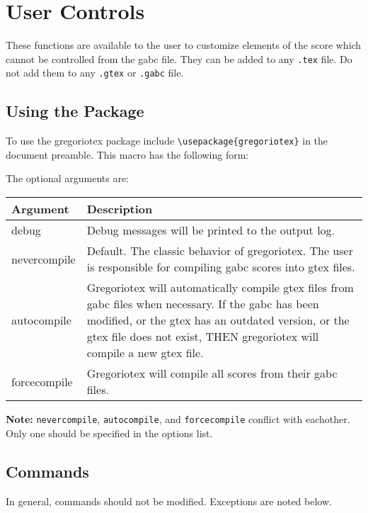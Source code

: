 \section{User Controls}

These functions are available to the user to customize elements of the
score which cannot be controlled from the gabc file. They can be added
to any \verb=.tex= file. Do not add them to any \verb=.gtex= or
\verb=.gabc= file.

\subsection{Using the Package}

To use the gregoriotex package include \verb=\usepackage{gregoriotex}=
in the document preamble. This macro has the following form:


The optional arguments are:

\bigskip{}
\begin{tabular}{lp{}}
  Argument & Description \\
  \hline
  debug & Debug messages will be printed to the output log. \\
  \hline
  nevercompile & Default. The classic behavior of gregoriotex. The user is %
    responsible for compiling gabc scores into gtex files.\\
  autocompile & Gregoriotex will automatically compile gtex files from gabc %
    files when necessary. If the gabc has been modified, or the %
    gtex has an outdated version, or the gtex file does not exist, %
    THEN gregoriotex will compile a new gtex file.\\
  forcecompile & Gregoriotex will compile all scores from their gabc files.\\
\end{tabular}\bigskip

\textbf{Note:} \verb=nevercompile=, \verb=autocompile=, and
\verb=forcecompile= conflict with eachother. Only one should be
specified in the options list.

\subsection{Commands}

In general, commands should not be modified.  Exceptions are noted below.

